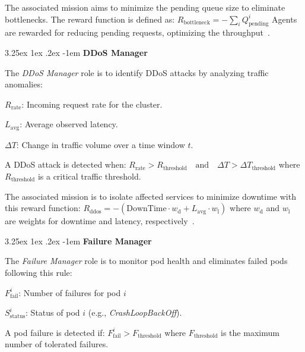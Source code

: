 \documentclass[conference]{IEEEtran}
\makeatletter
\renewcommand\paragraph{\@startsection{paragraph}{5}{\z@}%
  {3.25ex \@plus1ex \@minus.2ex}%
  {-1em}%
  {\normalfont\normalsize\bfseries}}
\makeatother
\begin{document}
The associated mission aims to minimize the pending queue size to eliminate bottlenecks. The reward function is defined as: $R_{\text{bottleneck}} = - \sum_{i} Q_{\text{pending}}^i$
Agents are rewarded for reducing pending requests, optimizing the throughput~\cite{burns2016borg}.

\noindent \paragraph{\textbf{DDoS Manager}}

The \textit{DDoS Manager} role is to identify DDoS attacks by analyzing traffic anomalies:
\begin{enumerate*}[label={}, itemjoin={;\quad }]
    \item \( R_{\text{rate}} \): Incoming request rate for the cluster.
    \item \( L_{\text{avg}} \): Average observed latency.
    \item \( \Delta T \): Change in traffic volume over a time window \( t \).
\end{enumerate*}
A DDoS attack is detected when:
$R_{\text{rate}} > R_{\text{threshold}} \quad \text{and} \quad \Delta T > \Delta T_{\text{threshold}}$
where \( R_{\text{threshold}} \) is a critical traffic threshold.

The associated mission is to isolate affected services to minimize downtime with this reward function:
$R_{\text{ddos}} = - \left( \text{DownTime} \cdot w_{\text{d}} + L_{\text{avg}} \cdot w_{\text{l}} \right)$
where \( w_{\text{d}} \) and \( w_{\text{l}} \) are weights for downtime and latency, respectively~\cite{Liu2018}.

\noindent \paragraph{\textbf{Failure Manager}}

The \textit{Failure Manager} role is to monitor pod health and eliminates failed pods following this rule:
\begin{enumerate*}[label={}, itemjoin={;\quad }]
    \item \( F_{\text{fail}}^i \): Number of failures for pod \( i \)
    \item \( S_{\text{status}}^i \): Status of pod \( i \) (e.g., \textit{CrashLoopBackOff}).
\end{enumerate*}
A pod failure is detected if:
$F_{\text{fail}}^i > F_{\text{threshold}}$
where \( F_{\text{threshold}} \) is the maximum number of tolerated failures.
\end{document}
